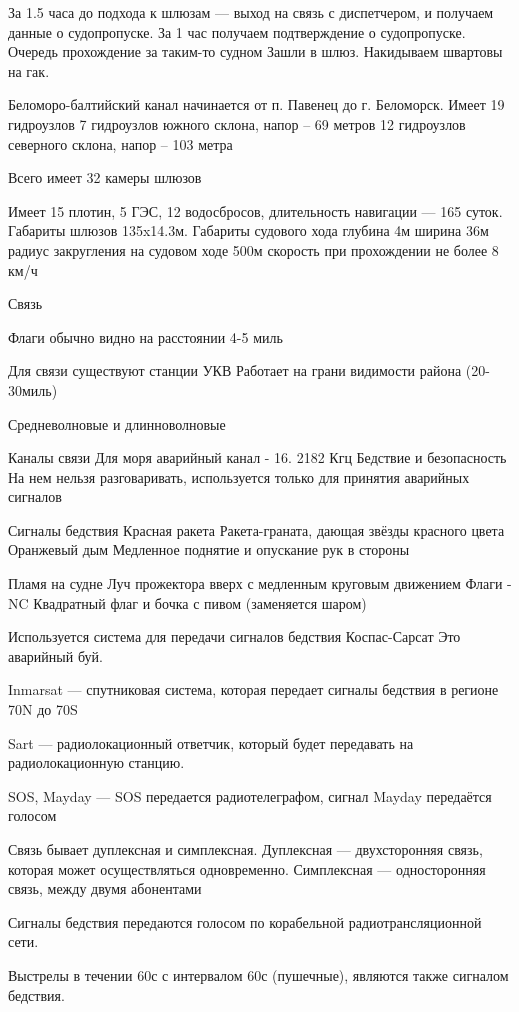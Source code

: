 \documentclass{article}        %
\begin{document}
За 1.5 часа до подхода к шлюзам --- выход на связь с диспетчером, и получаем данные о судопропуске.
За 1 час получаем подтверждение о судопропуске. Очередь прохождение за таким-то судном
Зашли в шлюз. Накидываем швартовы на гак. 

Беломоро-балтийский канал начинается от п. Павенец до г. Беломорск.
Имеет 19 гидроузлов
	7 гидроузлов южного склона, напор -- 69 метров
	12 гидроузлов северного склона, напор -- 103 метра

Всего имеет 32 камеры шлюзов

Имеет 15 плотин, 5 ГЭС, 12 водосбросов, длительность навигации --- 165 суток. Габариты шлюзов 135x14.3м. Габариты судового хода
	глубина 4м
	ширина 36м
	радиус закругления на судовом ходе 500м 
	скорость при прохождении не более 8 км/ч

Связь

Флаги обычно видно на расстоянии 4-5 миль

Для связи существуют станции УКВ
Работает на грани видимости района (20-30миль)


Средневолновые и длинноволновые


Каналы связи
Для моря аварийный канал - 16. 2182 Кгц Бедствие и безопасность
На нем нельзя разговаривать, используется только для принятия аварийных сигналов

Сигналы бедствия
Красная ракета
Ракета-граната, дающая звёзды красного цвета
Оранжевый дым
Медленное поднятие и опускание рук в стороны


Пламя на судне
Луч прожектора вверх с медленным круговым движением
Флаги - NC
Квадратный флаг и бочка с пивом (заменяется шаром)

Используется система для передачи сигналов бедствия Коспас-Сарсат
Это аварийный буй.

Inmarsat --- спутниковая система, которая передает сигналы бедствия в регионе 70\degree N до 70\degree S

Sart --- радиолокационный ответчик, который будет передавать на радиолокационную станцию.

SOS, Mayday --- SOS передается радиотелеграфом, сигнал Mayday передаётся голосом

Связь бывает дуплексная и симплексная.
Дуплексная --- двухсторонняя связь, которая может осуществляться одновременно.
Симплексная --- односторонняя связь, между двумя абонентами

Сигналы бедствия передаются голосом по корабельной радиотрансляционной сети.

Выстрелы в течении 60с с интервалом 60с (пушечные), являются также сигналом бедствия.
\end{document}
